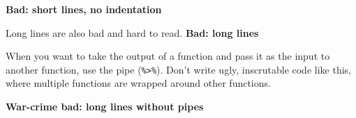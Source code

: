 \documentclass[]{book}
\newenvironment{Shaded}{\begin{snugshade}}{\end{snugshade}}
\newcommand{\DataTypeTok}[1]{\textcolor[rgb]{0.13,0.29,0.53}{#1}}
\newcommand{\DecValTok}[1]{\textcolor[rgb]{0.00,0.00,0.81}{#1}}
\newcommand{\KeywordTok}[1]{\textcolor[rgb]{0.13,0.29,0.53}{\textbf{#1}}}
\newcommand{\NormalTok}[1]{#1}
\newcommand{\OperatorTok}[1]{\textcolor[rgb]{0.81,0.36,0.00}{\textbf{#1}}}
\newcommand{\OtherTok}[1]{\textcolor[rgb]{0.56,0.35,0.01}{#1}}
\newcommand{\StringTok}[1]{\textcolor[rgb]{0.31,0.60,0.02}{#1}}
\begin{document}
\textbf{Bad: short lines, no indentation}

\begin{Shaded}
\end{Shaded}

Long lines are also bad and hard to read.
\textbf{Bad: long lines}

\begin{Shaded}
\end{Shaded}

When you want to take the output of a function and pass it as the input to another function, use the pipe (\texttt{\%\textgreater{}\%}). Don't write ugly, inscrutable code like this, where multiple functions are wrapped around other functions.

\textbf{War-crime bad: long lines without pipes}
\end{document}

